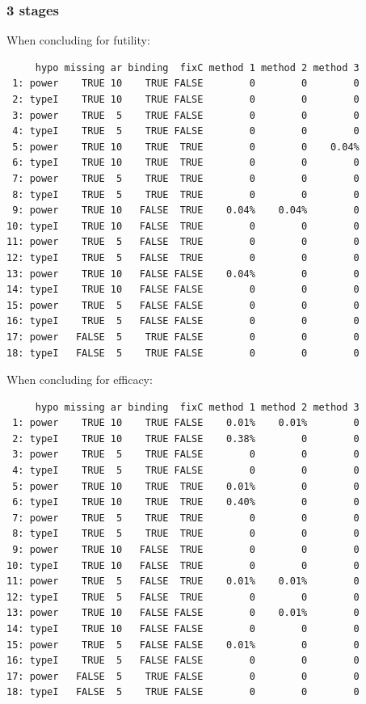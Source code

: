 \documentclass[12pt]{article}
\begin{document}
\clearpage

\subsubsection{3 stages}
\label{sec:org1746b3f}

When concluding for futility:
\begin{verbatim}
     hypo missing ar binding  fixC method 1 method 2 method 3
 1: power    TRUE 10    TRUE FALSE        0        0        0
 2: typeI    TRUE 10    TRUE FALSE        0        0        0
 3: power    TRUE  5    TRUE FALSE        0        0        0
 4: typeI    TRUE  5    TRUE FALSE        0        0        0
 5: power    TRUE 10    TRUE  TRUE        0        0    0.04%
 6: typeI    TRUE 10    TRUE  TRUE        0        0        0
 7: power    TRUE  5    TRUE  TRUE        0        0        0
 8: typeI    TRUE  5    TRUE  TRUE        0        0        0
 9: power    TRUE 10   FALSE  TRUE    0.04%    0.04%        0
10: typeI    TRUE 10   FALSE  TRUE        0        0        0
11: power    TRUE  5   FALSE  TRUE        0        0        0
12: typeI    TRUE  5   FALSE  TRUE        0        0        0
13: power    TRUE 10   FALSE FALSE    0.04%        0        0
14: typeI    TRUE 10   FALSE FALSE        0        0        0
15: power    TRUE  5   FALSE FALSE        0        0        0
16: typeI    TRUE  5   FALSE FALSE        0        0        0
17: power   FALSE  5    TRUE FALSE        0        0        0
18: typeI   FALSE  5    TRUE FALSE        0        0        0
\end{verbatim}

When concluding for efficacy:
\begin{verbatim}
     hypo missing ar binding  fixC method 1 method 2 method 3
 1: power    TRUE 10    TRUE FALSE    0.01%    0.01%        0
 2: typeI    TRUE 10    TRUE FALSE    0.38%        0        0
 3: power    TRUE  5    TRUE FALSE        0        0        0
 4: typeI    TRUE  5    TRUE FALSE        0        0        0
 5: power    TRUE 10    TRUE  TRUE    0.01%        0        0
 6: typeI    TRUE 10    TRUE  TRUE    0.40%        0        0
 7: power    TRUE  5    TRUE  TRUE        0        0        0
 8: typeI    TRUE  5    TRUE  TRUE        0        0        0
 9: power    TRUE 10   FALSE  TRUE        0        0        0
10: typeI    TRUE 10   FALSE  TRUE        0        0        0
11: power    TRUE  5   FALSE  TRUE    0.01%    0.01%        0
12: typeI    TRUE  5   FALSE  TRUE        0        0        0
13: power    TRUE 10   FALSE FALSE        0    0.01%        0
14: typeI    TRUE 10   FALSE FALSE        0        0        0
15: power    TRUE  5   FALSE FALSE    0.01%        0        0
16: typeI    TRUE  5   FALSE FALSE        0        0        0
17: power   FALSE  5    TRUE FALSE        0        0        0
18: typeI   FALSE  5    TRUE FALSE        0        0        0
\end{verbatim}
\end{document}

